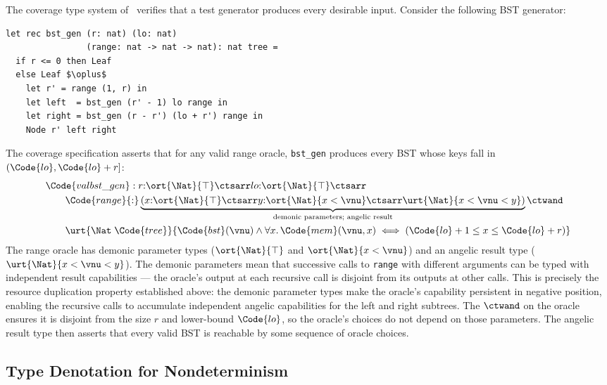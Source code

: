 \begin{example}\label{ex:coverage}
  The coverage type system of~\citet{CoverageType} verifies that a
  test generator produces every desirable input.  Consider the
  following BST generator:
\begin{lstlisting}
let rec bst_gen (r: nat) (lo: nat)
                (range: nat -> nat -> nat): nat tree =
  if r <= 0 then Leaf
  else Leaf $\oplus$
    let r' = range (1, r) in
    let left  = bst_gen (r' - 1) lo range in
    let right = bst_gen (r - r') (lo + r') range in
    Node r' left right
\end{lstlisting}
  The coverage specification asserts that for any valid range oracle,
  \texttt{bst\_gen} produces every BST whose keys fall in $(\Code{lo},
  \Code{lo}+r]$:
  \begin{align*}
    &\Code{val bst\_gen} :
      r{:}\ort{\Nat}{\top} \ctsarr lo{:}\ort{\Nat}{\top} \ctsarr
    \\&\quad\quad
      \Code{range}{:}\underbrace{(x{:}\ort{\Nat}{\top} \ctsarr
        y{:}\ort{\Nat}{x < \vnu} \ctsarr
        \urt{\Nat}{x < \vnu < y})}_{\text{demonic parameters; angelic result}}
      \ctwand
    \\&\quad\quad
      \urt{\Nat\;\Code{tree}}{\Code{bst}(\vnu) \land
        \forall x.\, \Code{mem}(\vnu, x) \iff
        (\Code{lo}+1 \leq x \leq \Code{lo}+r)}
  \end{align*}
  The range oracle has demonic parameter types ($\ort{\Nat}{\top}$ and
  $\ort{\Nat}{x < \vnu}$) and an angelic result type
  ($\urt{\Nat}{x < \vnu < y}$).  The demonic parameters mean that
  successive calls to \texttt{range} with different arguments can be
  typed with independent result capabilities — the oracle's output at
  each recursive call is disjoint from its outputs at other calls.
  This is precisely the resource duplication property established
  above: the demonic parameter types make the oracle's capability
  persistent in negative position, enabling the recursive calls to
  accumulate independent angelic capabilities for the left and right
  subtrees.  The $\ctwand$ on the oracle ensures it is disjoint from
  the size $r$ and lower-bound $\Code{lo}$, so the oracle's choices
  do not depend on those parameters.  The angelic result type then
  asserts that every valid BST is reachable by some sequence of
  oracle choices.
\end{example}

\subsection{Type Denotation for Nondeterminism}\label{subsec:nondet-denotation}

